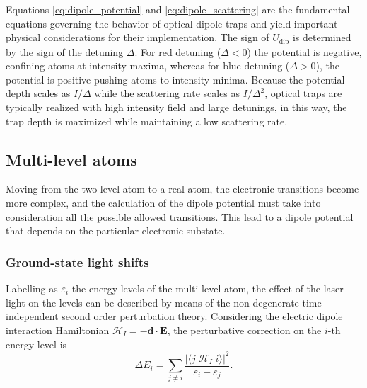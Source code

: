 Equations \eqref{eq:dipole_potential} and \eqref{eq:dipole_scattering} are the fundamental equations governing the behavior of optical dipole traps and yield important physical considerations for their implementation. The sign of $U_\text{dip}$ is determined by the sign of the detuning $\Delta$. For red detuning ($\Delta<0$) the potential is negative, confining atoms at intensity maxima, whereas for blue detuning ($\Delta>0$), the potential is positive pushing atoms to intensity minima. Because the potential depth scales as $I/\Delta$ while the scattering rate scales as $I/\Delta^2$, optical traps are typically realized with high intensity field and large detunings, in this way, the trap depth is maximized while maintaining a low scattering rate.



\subsection{Multi-level atoms}

Moving from the two-level atom to a real atom, the electronic transitions become more complex, and the calculation of the dipole potential must take into consideration all the possible allowed transitions. This lead to a dipole potential that depends on the particular electronic substate.

\subsubsection{Ground-state light shifts}
Labelling as $\varepsilon_i$ the energy levels of the multi-level atom, the effect of the laser light on the levels can be described by means of the non-degenerate time-independent second order perturbation theory. Considering the electric dipole interaction Hamiltonian $\mathcal{H}_I=-\hat{\mathbf{d}}\cdot\mathbf{E}$, the perturbative correction on the $i$-th energy level is
\begin{equation}
    \label{eq:energy_perturbative_correction}
    \Delta E_i = \sum_{j \neq i} \frac{|\langle j | \mathcal{H}_I | i\rangle|^2}{\varepsilon_i - \varepsilon_j}.
\end{equation}

